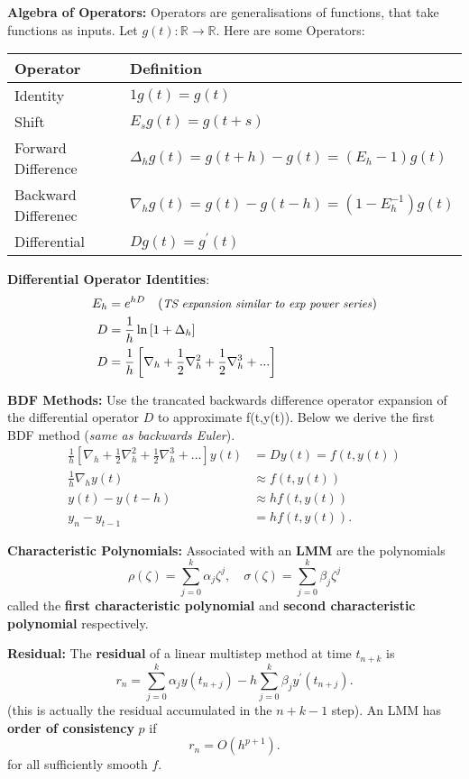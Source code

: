 \documentclass[10pt,a4paper]{article}
\newcommand{\R}{\mathbb{R}}
\begin{document}
\begin{multicols*}{2}
\textbf{Algebra of Operators:} Operators are generalisations of functions, that take functions as inputs. Let $g(t): \R \to \R$. Here are some Operators:

\begin{tabular}{l | l}
     \textbf{Operator}   & \textbf{Definition} \\
     \hline
     Identity            & $1 g(t) = g(t)$ \\
     Shift               & $E_sg(t) = g(t + s)$ \\
     Forward Difference  & $\Delta_hg(t) = g(t + h) - g(t) = (E_h - 1)g(t)$ \\
     Backward Differenec & $\nabla_hg(t) = g(t) - g(t - h) = (1 - E_h^{-1})g(t)$ \\
     Differential        & $Dg(t) = g^\prime(t)$
\end{tabular}

\textbf{Differential Operator Identities}:
\begin{align*}
    E_h &= e^{hD}\quad \small(\text{\textit{TS expansion similar to exp power series}})\normalsize\\
    D   &= \frac{1}{h}\ln\left[1 + \Delta_h\right]\\
    D   &= \frac{1}{h}\left[\nabla_h + \frac{1}{2}\nabla_h^2 + \frac{1}{2}\nabla_h^3 + ... \right]\\
\end{align*}

\textbf{BDF Methods:} Use the trancated backwards difference operator expansion of the differential operator $D$ to approximate f(t,y(t)). Below we derive the first BDF method (\textit{same as backwards Euler}).
\begin{align*}
    \frac{1}{h}\left[\nabla_h + \frac{1}{2}\nabla_h^2 + \frac{1}{2}\nabla_h^3 + ... \right]y(t) &= Dy(t) = f(t,y(t))\\
    \frac{1}{h}\nabla_h y(t) &\approx f(t,y(t))\\
    y(t) - y(t - h) &\approx hf(t,y(t))\\
    y_n - y_{t-1} &= hf(t, y(t)).
\end{align*}

\textbf{Characteristic Polynomials:} Associated with an \textbf{LMM} are the polynomials
\[
\rho(\zeta) = \sum_{j=0}^k \alpha_j \zeta^j, \quad \sigma(\zeta) = \sum_{j=0}^k \beta_j\zeta^j    
\]
called the \textbf{first characteristic polynomial} and \textbf{second characteristic polynomial} respectively.

\textbf{Residual:} The \textbf{residual} of a linear multistep method at time $t_{n+k}$ is 
\[
r_n = \sum_{j=0}^k \alpha_jy(t_{n+j}) - h\sum_{j=0}^k\beta_jy^\prime(t_{n+j}).
\] 
\small(this is actually the residual accumulated in the $n + k - 1$ step)\normalsize. An LMM has \textbf{order of consistency} $p$ if 
\[
r_n = O(h^{p+1}).    
\]
for all sufficiently smooth $f$.\\


\end{multicols*}
\end{document}
